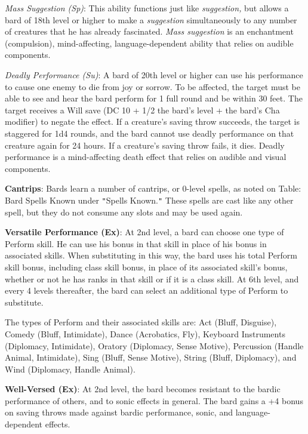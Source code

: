 \textit{Mass Suggestion (Sp)}: This ability functions just like \textit{suggestion, }but allows a bard of 18th level or higher to make a \textit{suggestion} simultaneously to any number of creatures that he has already fascinated. \textit{Mass suggestion} is an  enchantment (compulsion), mind-affecting, language-dependent ability that relies on audible components.
				
\textit{Deadly Performance (Su)}: A bard of 20th level or higher can use his performance to cause one enemy to die from joy or sorrow. To be affected, the target must be able to see and hear the bard perform for 1 full round and be within 30 feet. The target receives a Will save (DC 10 + 1/2 the bard's level + the bard's Cha modifier) to negate the effect. If a creature's saving throw succeeds, the target is staggered for 1d4 rounds, and the bard cannot use deadly performance on that creature again for 24 hours. If a creature's saving throw fails, it dies. Deadly performance is a mind-affecting death effect that relies on audible and visual components.
				
\textbf{Cantrips}: Bards learn a number of cantrips, or 0-level spells, as noted on Table: Bard Spells Known under \texttt{{}"{}}Spells Known.\texttt{{}"{}} These spells are cast like any other spell, but they do not consume any slots and may be used again.
				
\textbf{Versatile Performance (Ex)}: At 2nd level, a bard can choose one type of Perform skill. He can use his bonus in that skill in place of his bonus in associated skills. When substituting in this way, the bard uses his total Perform skill bonus, including class skill bonus, in place of its associated skill's bonus, whether or not he has ranks in that skill or if it is a class skill. At 6th level, and every 4 levels thereafter, the bard can select an additional type of Perform to substitute.
				
The types of Perform and their associated skills are: Act (Bluff, Disguise), Comedy (Bluff, Intimidate), Dance (Acrobatics, Fly), Keyboard Instruments (Diplomacy, Intimidate), Oratory (Diplomacy, Sense Motive), Percussion (Handle Animal, Intimidate), Sing (Bluff, Sense Motive), String (Bluff, Diplomacy), and Wind (Diplomacy, Handle Animal).
				
\textbf{Well-Versed (Ex)}: At 2nd level, the bard becomes resistant to the bardic performance of others, and to sonic effects in general. The bard gains a +4 bonus on saving throws made against bardic performance, sonic, and language-dependent effects. 
				
